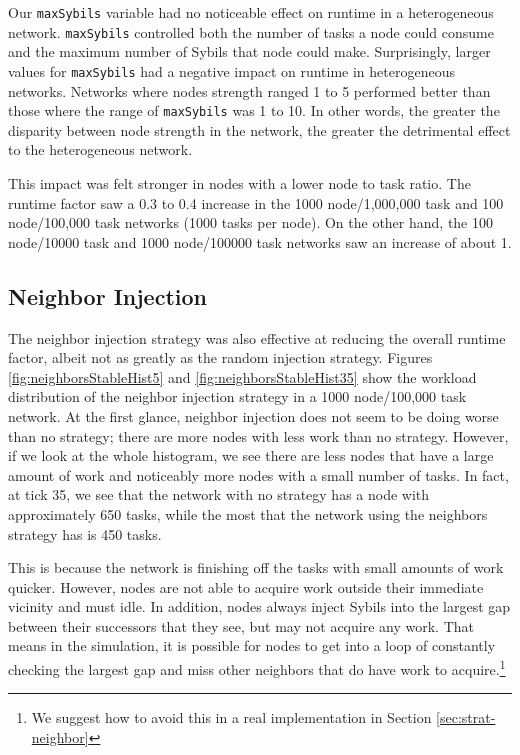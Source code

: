 \documentclass[11pt,conference]{IEEEtran}
\begin{document}
{	Our \texttt{maxSybils} variable had no noticeable effect on runtime in a heterogeneous network.
	\texttt{maxSybils} controlled both the number of tasks a node could consume and the maximum number of Sybils that node could make.
	Surprisingly, larger values for \texttt{maxSybils} had a negative impact on runtime in heterogeneous networks.
	Networks where nodes strength ranged 1 to 5 performed better than those where the range of \texttt{maxSybils} was 1 to 10.
	In other words, the greater the disparity between node strength in the network, the greater the detrimental effect to the heterogeneous network.
	
	This impact was felt stronger in nodes with a lower node to task ratio.
	The runtime factor saw  a 0.3 to 0.4 increase in the 1000 node/1,000,000 task and 100 node/100,000 task networks (1000 tasks per node).
	On the other hand, the 100 node/10000 task  and 1000 node/100000 task networks saw an increase of about 1.
	
	
	
	\subsection{Neighbor Injection}
	The neighbor injection strategy was also effective at reducing the overall runtime factor, albeit not as greatly as the random injection strategy.
	Figures \ref{fig:neighborsStableHist5} and \ref{fig:neighborsStableHist35} show the workload distribution of the neighbor injection strategy in a 1000 node/100,000 task network.
	At the first glance, neighbor injection does not seem to be doing worse than no strategy; there are more nodes with less work than no strategy.
	However, if we look at the whole histogram, we see there are less nodes that have a large amount of work and noticeably more nodes with a small number of tasks.
	In fact, at tick 35, we see that the network with no strategy has a node with approximately 650 tasks, while the most that the network using the neighbors strategy has is 450 tasks.
	
	This is because the network is finishing off the tasks with small amounts of work quicker.
	However, nodes are not able to acquire work outside their immediate vicinity and must idle.
	In addition, nodes always inject Sybils into the largest gap between their successors that they see, but may not acquire any work.
	That means in the simulation, it is possible for nodes to get into a loop of constantly checking the largest gap and miss other neighbors that do have work to acquire.\footnote{We suggest how to avoid this in a real implementation in Section \ref{sec:strat-neighbor}}
	
}
\end{document}
